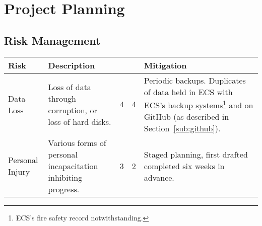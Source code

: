 \chapter{Project Planning}

\begin{landscape}
\section{Risk Management}
\begin{tabu} to 0.9\linewidth { X[3,r] | X[7,l] | X[c] | X[c] | X[7,l] }
Risk & Description &  &  & Mitigation \\ \hline
Data Loss &
  Loss of data through corruption, or loss of hard disks. &
  4 & 4 &
  Periodic backups. Duplicates of data held in ECS with ECS's backup systems\footnote{ECS's fire safety record notwithstanding.} and on GitHub (as described in Section~\ref{sub:github}). \\
Personal Injury &
  Various forms of personal incapacitation inhibiting progress. &
  3 & 2 &
  Staged planning, first drafted completed six weeks in advance. \\
\end{tabu}
\end{landscape}


